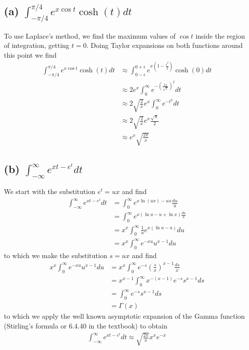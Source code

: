 \documentclass[12pt]{article}
\newcommand{\eq}[1]{\begin{align*}#1\end{align*}}
\begin{document}
\subsection*{(a) $\int_{-\pi/4}^{\pi/4} e^{x\cos t}\cosh(t)dt$} To use Laplace's method, we find the maximum values of $\cos t$ inside the region of integration, getting $t = 0$. Doing Taylor expansions on both functions around this point we find
\eq{
	\int_{-\pi/4}^{\pi/4} e^{x\cos t}\cosh(t)dt &\approx \int_{0-\epsilon}^{0+\epsilon} e^{x\left(1-\frac{t^2}{2}\right)} \cosh(0) dt\\
	&\approx 2e^x\int_{0}^\infty e^{-(\frac{tx}{\sqrt{2}})^2} dt\\
	&\approx 2\sqrt{\frac{2}{x}}e^x\int_{0}^\infty e^{-t^2} dt\\
	&\approx 2\sqrt{\frac{2}{x}}e^x\frac{\sqrt{\pi}}{2}\\
	&\approx e^x\sqrt{\frac{2\pi}{x}}
}
\subsection*{(b) $\int_{-\infty}^{\infty} e^{xt - e^t} dt$}
We start with the substitution $e^t = ux$ and find
\eq{
	\int_{-\infty}^\infty e^{xt - e^t} dt &= \int_0^\infty e^{x\ln(ux) - ux}\frac{du}{u}\\
	&= \int_0^\infty e^{x\left(\ln u - u + \ln x\right)\frac{du}{u}}\\
	&= x^x \int_0^\infty \frac{1}{u}e^{x\left(\ln u - u\right)} du\\
	&= x^x \int_0^\infty e^{-xu} u^{x-1}du
}
to which we make the substitution $s = ux$ and find
\eq{
	x^x \int_0^\infty e^{-xu} u^{x-1}du &= x^x \int_0^\infty e^{-s}\left(\frac{s}{x}\right)^{x-1} \frac{ds}{x}\\
	&= x^{x-1}\int_0^\infty x^{-(x-1)}e^{-s}s^{x-1}ds\\
	&= \int_0^\infty e^{-s}s^{x-1}ds\\
	&= \Gamma(x)
}
to which we apply the well known asymptotic expansion of the Gamma function (Stirling's formula or 6.4.40 in the textbook) to obtain
\eq{
	\int_{-\infty}^\infty e^{xt - e^t} dt \approx \sqrt{\frac{2\pi}{x}}x^xe^{-x}
}
\end{document}
